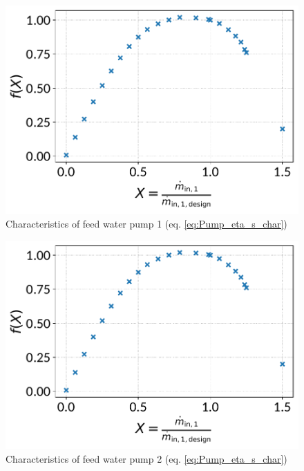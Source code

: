\begin{minipage}{0.5\textwidth}
\begin{figure}[H]\begin{center}
\includegraphics[width=\textwidth]{figures/Pump_CharLine_eta_s_char_feed_water_pump_1.pdf}
\caption{Characteristics of feed water pump 1 (eq. \ref{eq:Pump_eta_s_char})}
\label{fig:CharLine_eta_s_char_feed water pump 1}
\end{center}\end{figure}

\end{minipage}
\begin{minipage}{0.5\textwidth}
\begin{figure}[H]\begin{center}
\includegraphics[width=\textwidth]{figures/Pump_CharLine_eta_s_char_feed_water_pump_2.pdf}
\caption{Characteristics of feed water pump 2 (eq. \ref{eq:Pump_eta_s_char})}
\label{fig:CharLine_eta_s_char_feed water pump 2}
\end{center}\end{figure}

\end{minipage}


